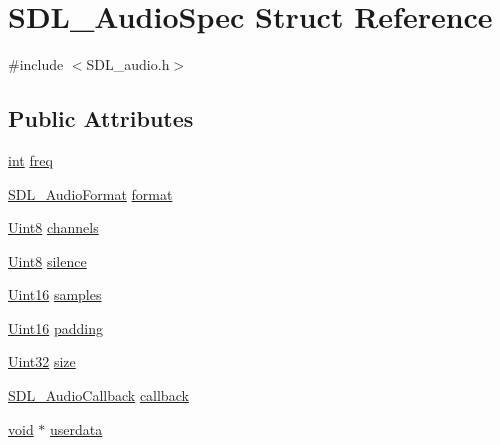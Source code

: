 \hypertarget{struct_s_d_l___audio_spec}{}\section{S\+D\+L\+\_\+\+Audio\+Spec Struct Reference}
\label{struct_s_d_l___audio_spec}


{\ttfamily \#include $<$S\+D\+L\+\_\+audio.\+h$>$}

\subsection*{Public Attributes}
\begin{DoxyCompactItemize}
\item 
\mbox{\hyperlink{warnings_8h_a74f207b5aa4ba51c3a2ad59b219a423b}{int}} \mbox{\hyperlink{struct_s_d_l___audio_spec_a8b823ce46fc2e448cf7e6fc141aff6b2}{freq}}
\item 
\mbox{\hyperlink{_s_d_l__audio_8h_a491ed103fd25d920c4e6b7495217ce66}{S\+D\+L\+\_\+\+Audio\+Format}} \mbox{\hyperlink{struct_s_d_l___audio_spec_ae37c634cac5807762f184c8d5d49fc2d}{format}}
\item 
\mbox{\hyperlink{_s_d_l__stdinc_8h_a2944638813a090aa23e62f4da842c3e2}{Uint8}} \mbox{\hyperlink{struct_s_d_l___audio_spec_a31fe8b3710cf23bbef24be8a1749fe46}{channels}}
\item 
\mbox{\hyperlink{_s_d_l__stdinc_8h_a2944638813a090aa23e62f4da842c3e2}{Uint8}} \mbox{\hyperlink{struct_s_d_l___audio_spec_addc462c8a806e6c122eccf63482048f6}{silence}}
\item 
\mbox{\hyperlink{_s_d_l__stdinc_8h_a31fcc0a076c9068668173ee26d33e42b}{Uint16}} \mbox{\hyperlink{struct_s_d_l___audio_spec_a2cdf5e885808c10bfa2810b706e69f95}{samples}}
\item 
\mbox{\hyperlink{_s_d_l__stdinc_8h_a31fcc0a076c9068668173ee26d33e42b}{Uint16}} \mbox{\hyperlink{struct_s_d_l___audio_spec_a738371fc13b54cefef4db16994abeeb6}{padding}}
\item 
\mbox{\hyperlink{_s_d_l__stdinc_8h_add440eff171ea5f55cb00c4a9ab8672d}{Uint32}} \mbox{\hyperlink{struct_s_d_l___audio_spec_a154cf44743ecec78c36dc6c827dd2fdb}{size}}
\item 
\mbox{\hyperlink{_s_d_l__audio_8h_a379fcc25845e46bfa80cb3619fc2821c}{S\+D\+L\+\_\+\+Audio\+Callback}} \mbox{\hyperlink{struct_s_d_l___audio_spec_a1f8d05139f1679dcf359f49251233eac}{callback}}
\item 
\mbox{\hyperlink{_s_d_l__opengles2__gl2ext_8h_ae5d8fa23ad07c48bb609509eae494c95}{void}} $\ast$ \mbox{\hyperlink{struct_s_d_l___audio_spec_aeec9481666f5f0982c98d3878f175d9b}{userdata}}
\end{DoxyCompactItemize}


